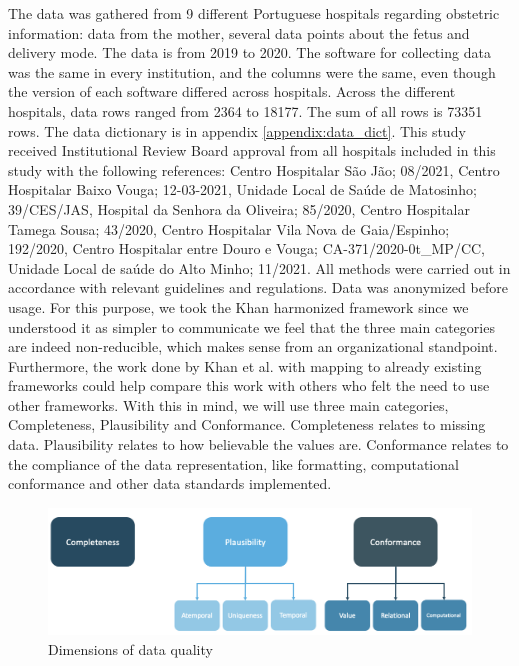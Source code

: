 The data was gathered from 9 different Portuguese hospitals regarding obstetric information: data from the mother, several data points about the fetus and delivery mode. The data is from 2019 to 2020. The software for collecting data was the same in every institution, and the columns were the same, even though the version of each software differed across hospitals. Across the different hospitals, data rows ranged from 2364 to 18177. The sum of all rows is 73351 rows. The data dictionary is in appendix \ref{appendix:data_dict}. This study received Institutional Review Board approval from all hospitals included in this study with the following references: Centro Hospitalar São Jão; 08/2021, Centro Hospitalar Baixo Vouga; 12-03-2021, Unidade Local de Saúde de Matosinho; 39/CES/JAS, Hospital da Senhora da Oliveira; 85/2020, Centro Hospitalar Tamega Sousa; 43/2020, Centro Hospitalar Vila Nova de Gaia/Espinho; 192/2020, Centro Hospitalar entre Douro e Vouga; CA-371/2020-0t\_MP/CC, Unidade Local de saúde do Alto Minho; 11/2021. All methods were carried out in accordance with relevant guidelines and regulations.
Data was anonymized before usage. 
For this purpose, we took the Khan harmonized framework since we understood it as simpler to communicate we feel that the three main categories are indeed non-reducible, which makes sense from an organizational standpoint. Furthermore, the work done by Khan et al. with mapping to already existing frameworks could help compare this work with others who felt the need to use other frameworks. With this in mind, we will use three main categories, Completeness, Plausibility and Conformance. Completeness relates to missing data. Plausibility relates to how believable the values are. Conformance relates to the compliance of the data representation, like formatting, computational conformance and other data standards implemented. 

\begin{figure}[htbp]
\centering
\caption{Dimensions of data quality}\label{fig:categories} 
\includegraphics[scale=0.29]{figures/data-quality-v1.png}
\end{figure}
